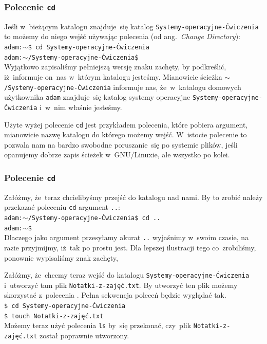\documentclass[10pt,t]{beamer}
\begin{document}
\begin{frame}
  \frametitle{Polecenie \texttt{cd}}


  Jeśli w~bieżącym katalogu znajduje~się katalog
  \texttt{Systemy-operacyjne-Ćwiczenia} to możemy do niego wejść
  używając polecenia
  (od ang.~\textit{Change Directory}): \\
  \texttt{adam:$\sim$\$ cd Systemy-operacyjne-Ćwiczenia} \\
  \texttt{adam:$\sim$/Systemy-operacyjne-Ćwiczenia\$} \\
  Wyjątkowo zapisaliśmy pełniejszą wersję znaku zachęty, by podkreślić,
  iż~informuje on~nas w~którym katalogu jesteśmy. Mianowicie ścieżka
  \texttt{$\sim$/Systemy-operacyjne-Ćwiczenia} informuje nas, że~w~katalogu
  domowych użytkownika \texttt{adam} znajduje~się katalog systemy
  operacyjne \texttt{Systemy-operacyjne-Ćwiczenia} i~w~nim właśnie jesteśmy.

  Użyte wyżej polecenie \texttt{cd} jest przykładem polecenia, które
  pobiera argument, mianowicie nazwę katalogu do którego możemy wejść.
  W~istocie polecenie to pozwala nam na bardzo swobodne poruszanie~się
  po systemie plików, jeśli opanujemy dobrze zapis ścieżek w~GNU/Linuxie,
  ale wszystko po kolei.

\end{frame}





\begin{frame}
  \frametitle{Polecenie \texttt{cd}}


  Załóżmy, że~teraz chcielibyśmy przejść do katalogu nad nami. By to zrobić
  należy przekazać poleceniu \texttt{cd} argument \texttt{..}: \\
  \texttt{adam:$\sim$/Systemy-operacyjne-Ćwiczenia\$ cd ..} \\
  \texttt{adam:$\sim$\$} \\
  Dlaczego jako argument przesyłamy akurat \texttt{..} wyjaśnimy w~swoim
  czasie, na razie przyjmijmy, iż~tak po prostu jest. Dla lepszej
  ilustracji tego co~zrobiliśmy, ponownie wypisaliśmy znak zachęty,

  Załóżmy, że~chcemy teraz wejść do katalogu
  \texttt{Systemy-operacyjne-Ćwiczenia} i~utworzyć tam plik
  \texttt{Notatki-z-zajęć.txt}. By utworzyć ten plik możemy skorzystać
  z~polecenia
  . Pełna
  sekwencja poleceń będzie wyglądać tak. \\
  \texttt{\$ cd Systemy-operacyjne-Ćwiczenia} \\
  \texttt{\$ touch Notatki-z-zajęć.txt} \\
  Możemy teraz użyć polecenia \texttt{ls} by~się przekonać, czy~plik
  \texttt{Notatki-z-zajęć.txt} został poprawnie utworzony.

\end{frame}
\end{document}
